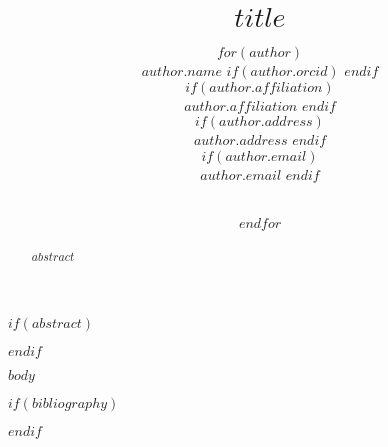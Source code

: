 \documentclass[a4paper]{article}
\title{$title$}
\author{
$for(author)$

$author.name$ $if(author.orcid)$ \orcid{$author.orcid$} $endif$

$if(author.affiliation)$
 \\ $author.affiliation$
$endif$

$if(author.address)$
 \\ $author.address$
$endif$

$if(author.email)$
 \\ $author.email$
$endif$

\\

\and

$endfor$
}
\begin{document}
\maketitle

$if(abstract)$
\begin{abstract}
$abstract$
\end{abstract}
$endif$

$body$


$if(bibliography)$

$endif$
\end{document}
